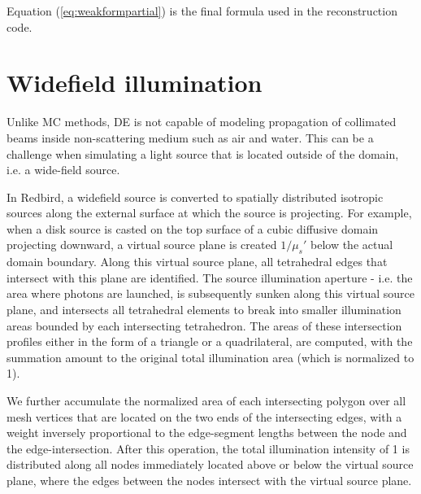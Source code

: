 \documentclass[12pt]{book}               %
\begin{document}
Equation (\ref{eq:weakformpartial}) is the final formula used in
the reconstruction code.

\section{Widefield illumination}
Unlike MC methods, DE is not capable of modeling propagation of collimated beams inside non-scattering medium such as air and water. This can be a challenge when simulating a light source that is located outside of the domain, i.e. a wide-field source.

In Redbird, a widefield source is converted to spatially distributed isotropic sources along the external surface at which the source is projecting. For example, when a disk source is casted on the top surface of a cubic diffusive domain projecting downward, a virtual source plane is created $1/\mu_s'$ below the actual domain boundary. Along this virtual source plane, all tetrahedral edges that intersect with this plane are identified. The source illumination aperture - i.e. the area where photons are launched, is subsequently sunken along this virtual source plane, and intersects all tetrahedral elements to break into smaller illumination areas bounded by each intersecting tetrahedron. The areas of these intersection profiles either in the form of a triangle or a quadrilateral, are computed, with the summation amount to the original total illumination area (which is normalized to 1).

We further accumulate the normalized area of each intersecting polygon over all mesh vertices that are located on the two ends of the intersecting edges, with a weight inversely proportional to the edge-segment lengths between the node and the edge-intersection. After this operation, the total illumination intensity of 1 is distributed along all nodes immediately located above or below the virtual source plane, where the edges between the nodes intersect with the virtual source plane.
\end{document}
